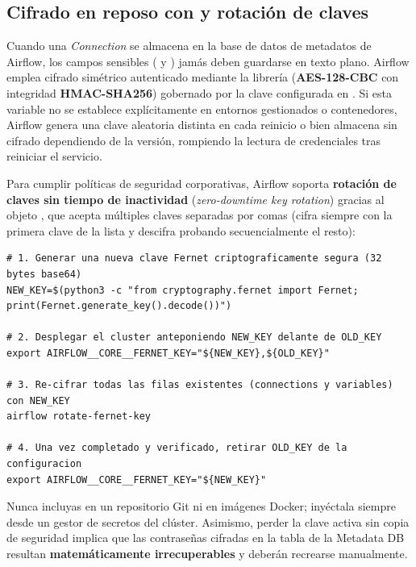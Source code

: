 \subsection{Cifrado en reposo con \texorpdfstring{}{FERNET\_KEY} y rotación de claves}

Cuando una \textit{Connection} se almacena en la base de datos de metadatos de Airflow, los campos sensibles ( y ) jamás deben guardarse en texto plano. Airflow emplea cifrado simétrico autenticado mediante la librería  (\textbf{AES-128-CBC} con integridad \textbf{HMAC-SHA256}) gobernado por la clave configurada en . Si esta variable no se establece explícitamente en entornos gestionados o contenedores, Airflow genera una clave aleatoria distinta en cada reinicio o bien almacena sin cifrado dependiendo de la versión, rompiendo la lectura de credenciales tras reiniciar el servicio.

Para cumplir políticas de seguridad corporativas, Airflow soporta \textbf{rotación de claves sin tiempo de inactividad} (\textit{zero-downtime key rotation}) gracias al objeto , que acepta múltiples claves separadas por comas (cifra siempre con la primera clave de la lista y descifra probando secuencialmente el resto):

\begin{lstlisting}[style=bash, caption={Generación y procedimiento de rotación segura de \code{FERNET\_KEY} sin pérdida de servicio.}, label={lst:fernet-rotation}]
# 1. Generar una nueva clave Fernet criptograficamente segura (32 bytes base64)
NEW_KEY=$(python3 -c "from cryptography.fernet import Fernet; print(Fernet.generate_key().decode())")

# 2. Desplegar el cluster anteponiendo NEW_KEY delante de OLD_KEY
export AIRFLOW__CORE__FERNET_KEY="${NEW_KEY},${OLD_KEY}"

# 3. Re-cifrar todas las filas existentes (connections y variables) con NEW_KEY
airflow rotate-fernet-key

# 4. Una vez completado y verificado, retirar OLD_KEY de la configuracion
export AIRFLOW__CORE__FERNET_KEY="${NEW_KEY}"
\end{lstlisting}

\begin{warningbox}
Nunca incluyas  en un repositorio Git ni en imágenes Docker; inyéctala siempre desde un gestor de secretos del clúster. Asimismo, perder la clave activa sin copia de seguridad implica que las contraseñas cifradas en la tabla  de la Metadata DB resultan \textbf{matemáticamente irrecuperables} y deberán recrearse manualmente.
\end{warningbox}

